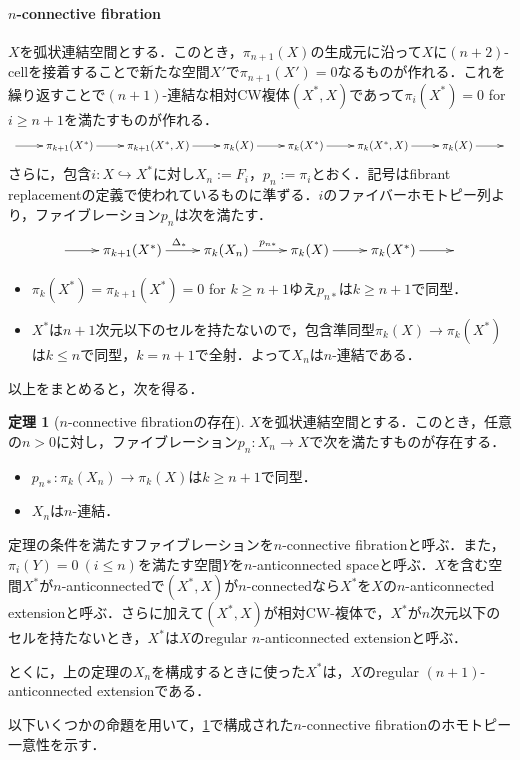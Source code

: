 \documentclass[a4paper,11pt]{jsarticle}
\theoremstyle{definition}
\newtheorem{thm}{定理}[section]
\begin{document}
\paragraph{$n$-connective fibration}
$X$を弧状連結空間とする．このとき，$\pi_{n+1}(X)$の生成元に沿って$X$に$(n+2)$-cellを接着することで新たな空間$X'$で$\pi_{n+1}(X')=0$なるものが作れる．これを繰り返すことで$(n+1)$-連結な相対CW複体$(X^*,X)$であって$\pi_i(X^*)=0$ for $i\ge n+1$を満たすものが作れる．
\[
\xymatrix{
  \ar[r]&
  \pi_{k+1}(X^*)\ar[r]&
  \pi_{k+1}(X^*,X)\ar[r]&
  \pi_{k}(X)\ar[r]&
  \pi_k(X^*)\ar[r]&
  \pi_k(X^*,X)\ar[r]&
  \pi_k(X)\ar[r]&
}  
\]
さらに，包含$i\colon X\hookrightarrow X^*$に対し$X_n:=F_i$，$p_n:=\pi_i$とおく．記号はfibrant replacementの定義で使われているものに準ずる．$i$のファイバーホモトピー列より，ファイブレーション$p_n$は次を満たす．
\[\xymatrix{
  \ar[r]&
  \pi_{k+1}(X^*)\ar[r]^{\Delta_*}&
  \pi_k(X_n)\ar[r]^{p_{n*}}&
  \pi_k(X)\ar[r]&
  \pi_k(X^*)\ar[r]&
}\]
\begin{itemize}
  \item $\pi_k(X^*)=\pi_{k+1}(X^*)=0$ for $k\ge n+1$ゆえ$p_{n*}$は$k\ge n+1$で同型．
  \item $X^*$は$n+1$次元以下のセルを持たないので，包含準同型$\pi_{k}(X)\to \pi_k(X^*)$は$k\le n$で同型，$k=n+1$で全射．よって$X_n$は$n$-連結である．
\end{itemize}
以上をまとめると，次を得る．
\begin{thm}[$n$-connective fibrationの存在]\label{existenceOfConnFib}
  $X$を弧状連結空間とする．このとき，任意の$n>0$に対し，ファイブレーション$p_n\colon X_n\to X$で次を満たすものが存在する．
  \begin{itemize}
    \item $p_{n*}\colon \pi_k(X_n)\to \pi_k(X)$は$k\ge n+1$で同型．
    \item $X_n$は$n$-連結．
  \end{itemize}
\end{thm}
定理の条件を満たすファイブレーションを$n$-connective fibrationと呼ぶ．また，$\pi_i(Y)=0\ (i\le n)$を満たす空間$Y$を$n$-anticonnected spaceと呼ぶ．$X$を含む空間$X^*$が$n$-anticonnectedで$(X^*,X)$が$n$-connectedなら$X^*$を$X$の$n$-anticonnected extensionと呼ぶ．さらに加えて$(X^*,X)$が相対CW-複体で，$X^*$が$n$次元以下のセルを持たないとき，$X^*$は$X$のregular $n$-anticonnected extensionと呼ぶ．

とくに，上の定理の$X_n$を構成するときに使った$X^*$は，$X$のregular $(n+1)$-anticonnected extensionである．

以下いくつかの命題を用いて，\ref{existenceOfConnFib}で構成された$n$-connective fibrationのホモトピー一意性を示す．
\end{document}
